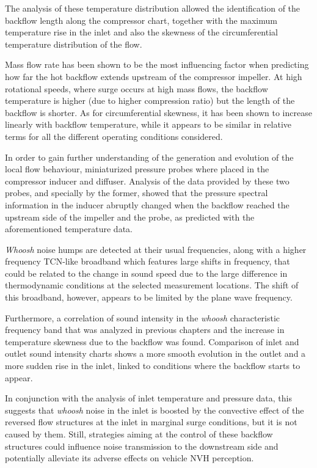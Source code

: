 The analysis of these temperature distribution allowed the identification of the backflow length along the compressor chart, together with the maximum temperature rise in the inlet and also the skewness of the circumferential temperature distribution of the flow.

Mass flow rate has been shown to be the most influencing factor when predicting how far the hot backflow extends upstream of the compressor impeller. At high rotational speeds, where surge occurs at high mass flows, the backflow temperature is higher (due to higher compression ratio) but the length of the backflow is shorter. As for circumferential skewness, it has been shown to increase linearly with backflow temperature, while it appears to be similar in relative terms for all the different operating conditions considered.

In order to gain further understanding of the generation and evolution of the local flow behaviour, miniaturized pressure probes where placed in the compressor inducer and diffuser. Analysis of the data provided by these two probes, and specially by the former, showed that the pressure spectral information in the inducer abruptly changed when the backflow reached the upstream side of the impeller and the probe, as predicted with the aforementioned temperature data. 

\emph{Whoosh} noise humps are detected at their usual frequencies, along with a higher frequency TCN-like broadband which features large shifts in frequency, that could be related to the change in sound speed due to the large difference in thermodynamic conditions at the selected measurement locations. The shift of this broadband, however, appears to be limited by the plane wave frequency.

Furthermore, a correlation of sound intensity in the \emph{whoosh} characteristic frequency band that was analyzed in previous chapters and the increase in temperature skewness due to the backflow was found. Comparison of inlet and outlet sound intensity charts shows a more smooth evolution in the outlet and a more sudden rise in the inlet, linked to conditions where the backflow starts to appear.

In conjunction with the analysis of inlet temperature and pressure data, this suggests that \emph{whoosh} noise in the inlet is boosted by the convective effect of the reversed flow structures at the inlet in marginal surge conditions, but it is not caused by them. Still, strategies aiming at the control of these backflow structures could influence noise transmission to the downstream side and potentially alleviate its adverse effects on vehicle NVH perception.

